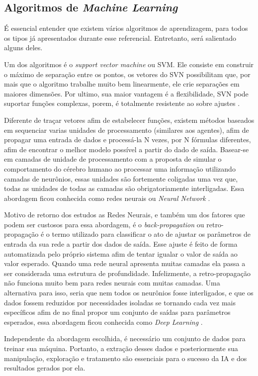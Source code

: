 \subsection{Algoritmos de \textit{Machine Learning}}
É essencial entender que existem vários algoritmos de aprendizagem, para todos os tipos já apresentados durante esse referencial. Entretanto, será salientado alguns deles.

Um dos algoritmos é o \textit{support vector machine} ou SVM. Ele consiste em construir o máximo de separação entre os pontos, os vetores do SVN possibilitam que, por mais que o algoritmo trabalhe muito bem linearmente, ele crie separações em maiores dimensões. Por ultimo, sua maior vantagem é a flexibilidade, SVN pode suportar funções complexas, porem, é totalmente resistente ao sobre ajustes \cite[744]{russell2003artificial}.

Diferente de traçar vetores afim de estabelecer funções, existem métodos baseados em sequenciar varias unidades de processamento (similares aos agentes), afim de propagar uma entrada de dados e processá-la N vezes, por N fórmulas diferentes, afim de encontrar o melhor modelo possível a partir do dado de saída. Basear-se em camadas de unidade de processamento com a proposta de simular o comportamento do cérebro humano ao processar uma informação utilizando camadas de neurônios, essas unidades são fortemente coligadas uma vez que, todas as unidades de todas as camadas são obrigatoriamente interligadas. Essa abordagem ficou conhecida como redes neurais ou \textit{Neural Network} \cite{haykin2004comprehensive, russell2003artificial}.

Motivo de retorno dos estudos as Redes Neurais, e também um dos fatores que podem ser custosos para essa abordagem, é o \textit{back-propagation} ou retro-propagação é o termo utilizado para classificar o ato de ajustar os parâmetros de entrada da sua rede a partir dos dados de saída. Esse ajuste é feito de forma automatizada pelo próprio sistema afim de tentar igualar o valor de saída ao valor esperado. Quando uma rede neural apresenta muitas camadas ela passa a ser considerada uma estrutura de profundidade. Infelizmente, a retro-propagação não funciona muito bem para redes neurais com muitas camadas. Uma alternativa para isso, seria que nem todos os neurônios fosse interligados, e que os dados fossem reduzidos por necessidades isoladas se tornando cada vez mais específicos afim de no final propor um conjunto de saídas para parâmetros esperados, essa abordagem ficou conhecida como \textit{Deep Learning} \cite{lecun2015deep}.

Independente da abordagem escolhida, é necessário um conjunto de dados para treinar sua máquina. Portanto, a extração desses dados e posteriormente sua manipulação, exploração e tratamento são essenciais para o sucesso da IA e dos resultados gerados por ela.
